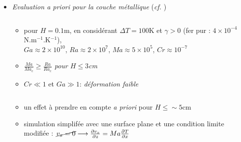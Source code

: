 \begin{frame}[fragile]
\begin{itemize}
\item \emph{Evaluation \textit{a priori} pour la couche métallique} (\textit{cf.} \cite{Saas2017})
\begin{columns}[T]
    \begin{column}{0.6\textwidth}
    \baselineskip
    \begin{itemize}
\item pour $H=0.1$m, en considérant $\Delta T = 100$K et \emph{$\gamma>0$} (fer pur : $4\times 10^{-4}$N.m$^{-1}$.K$^{-1}$), \\
$Ga\approx 2\times 10^{10}$, $Ra\approx 2\times 10^{7}$, $Ma\approx 5\times 10^{5}$, $Cr\approx 10^{-7}$
\item \emph{$\frac{Ma}{Ma_c}\ge\frac{Ra}{Ra_c}$ pour $H\le 3$cm}
\item $Cr\ll 1$ et $Ga\gg 1$: \emph{déformation faible}
\end{itemize}
    \end{column}
    \end{columns}
    \begin{itemize}
    \item un effet à prendre en compte \textit{a priori} pour $H \le \sim 5$cm
    \item simulation simplifée avec une surface plane et une condition limite modifiée : $\cancel{v_x=0} \longrightarrow \frac{\partial v_x}{\partial z} = Ma \frac{\partial T}{\partial x}$

\end{itemize}
\end{itemize}
\end{frame}
